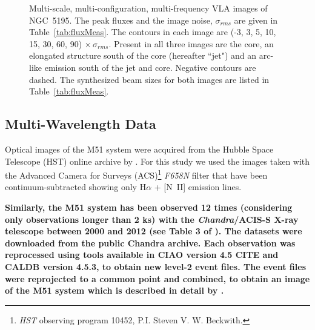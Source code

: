 \documentclass[fleqn,usenatbib]{mnras}
\def\tab{Table}
\begin{document}
\begin{figure}
\caption{Multi-scale, multi-configuration, multi-frequency VLA images of NGC~5195. The peak fluxes and the image noise, $\sigma_{rms}$ are given in \tab~\ref{tab:fluxMeas}. The contours in each image are (-3, 3, 5, 10, 15, 30, 60, 90) $\times\, \sigma_{rms}$. Present in all three images are the core, an elongated structure south of the core (hereafter ``jet") and an arc-like emission south of the jet and core. Negative contours are dashed. The synthesized beam sizes for both images are listed in \tab~\ref{tab:fluxMeas}.}
\label{fig:VLAMaps}
\end{figure}


\subsection{Multi-Wavelength Data}

Optical images of the M51 system were acquired from the Hubble Space Telescope (HST) online archive by \cite{Rampadarathetal15}. For this study we used the images taken with the Advanced Camera for Surveys (ACS)\footnote{\textit{HST} observing program 10452, P.I. Steven V. W. Beckwith.} \textit{F658N} filter that have been continuum-subtracted showing only H$\alpha$ + [N~II] emission lines.

\textbf{Similarly, the M51 system has been observed 12 times  (considering only observations longer than 2 ks) with the \textit{Chandra}/ACIS-S X-ray telescope between 2000 and 2012 (see Table 3 of \citealt{Rampadarathetal15}). The datasets were downloaded from the public Chandra archive. Each observation was reprocessed using tools available in CIAO version 4.5 CITE and CALDB version 4.5.3, to obtain new level-2 event files. The event files were reprojected to a common point and combined, to obtain an image of the M51 system which is described in detail by \cite{Rampadarathetal15}.}
\end{document}
